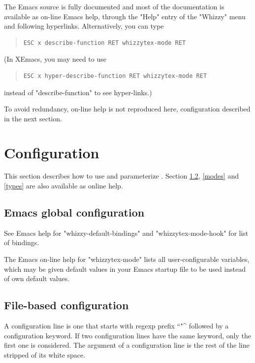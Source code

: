 \documentclass[12pt]{article}
\begin{document}
The Emacs source is fully documented and most of the documentation is
available  as on-line Emacs help, through the \lst"Help" entry of the
\lst"Whizzy" menu and following hyperlinks.
%
Alternatively, you can type
\begin{quote}
\begin{verbatim}
ESC x describe-function RET whizzytex-mode RET
\end{verbatim}
\end{quote}
(In XEmacs, you may need to use
\begin{quote}
\begin{verbatim}
ESC x hyper-describe-function RET whizzytex-mode RET
\end{verbatim}
\end{quote}
instead of \lst"describe-function" to see hyper-links.)

To avoid redundancy, on-line help is not reproduced here, configuration
described in the next section.


\section{Configuration} 
\label{manual}

This section describes how to use and parameterize {\whizzy}.  
Section \ref{configuration}, \ref{modes} and
\ref{types} are also available as online help. 


\subsection {Emacs global configuration}

\label{configuration.viewers}
\label{configuration.bindings}
\label{Emacs-configuration}

See Emacs help for \lst"whizzy-default-bindings" and
\lst"whizzytex-mode-hook" for list of bindings.

The Emacs on-line help for \lst"whizzytex-mode" lists all user-configurable
variables,  which  may be given default values in your Emacs startup file
to be used instead of {\whizzy} own default values. 

\subsection {File-based configuration}

\label{configuration}
\label {File-configuration}


A configuration line is one that starts with regexp prefix ``\lst"^%
followed by a configuration keyword.  If two configuration lines have the same
keyword, only the first one is considered. The argument of a configuration
line is the rest of the line stripped of its white space.
\end{document}
